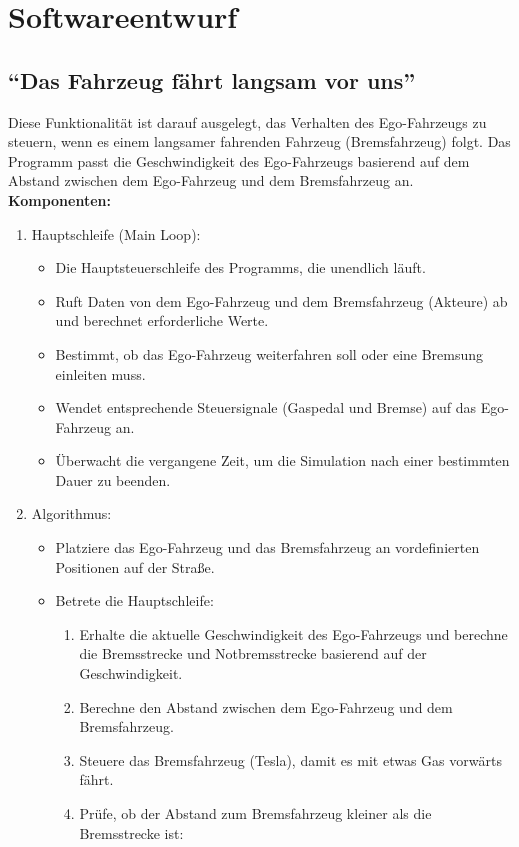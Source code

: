 \section{Softwareentwurf} %
\subsection{\enquote{Das Fahrzeug fährt langsam vor uns}}
Diese Funktionalität ist darauf ausgelegt, das Verhalten des Ego-Fahrzeugs zu steuern, wenn es einem langsamer fahrenden Fahrzeug (Bremsfahrzeug) folgt. Das Programm passt die Geschwindigkeit des Ego-Fahrzeugs basierend auf dem Abstand zwischen dem Ego-Fahrzeug und dem Bremsfahrzeug an. \newline
\textbf{Komponenten:}
\begin{enumerate}
	\item Hauptschleife (Main Loop):
	\begin{itemize}
		\item Die Hauptsteuerschleife des Programms, die unendlich läuft.
		\item Ruft Daten von dem Ego-Fahrzeug und dem Bremsfahrzeug (Akteure) ab und berechnet erforderliche Werte.
		\item Bestimmt, ob das Ego-Fahrzeug weiterfahren soll oder eine Bremsung einleiten muss.
		\item Wendet entsprechende Steuersignale (Gaspedal und Bremse) auf das Ego-Fahrzeug an.
		\item Überwacht die vergangene Zeit, um die Simulation nach einer bestimmten Dauer zu beenden.
	\end{itemize}
	\item Algorithmus:
	\begin{itemize}
		\item Platziere das Ego-Fahrzeug und das Bremsfahrzeug an vordefinierten Positionen auf der Straße.
		\item Betrete die Hauptschleife:
		\begin{enumerate}
			\item Erhalte die aktuelle Geschwindigkeit des Ego-Fahrzeugs und berechne die Bremsstrecke und Notbremsstrecke basierend auf der Geschwindigkeit.
			\item Berechne den Abstand zwischen dem Ego-Fahrzeug und dem Bremsfahrzeug.
			\item Steuere das Bremsfahrzeug (Tesla), damit es mit etwas Gas vorwärts fährt.
			\item Prüfe, ob der Abstand zum Bremsfahrzeug kleiner als die Bremsstrecke ist:

\end{enumerate}
\end{itemize}
\end{enumerate}
